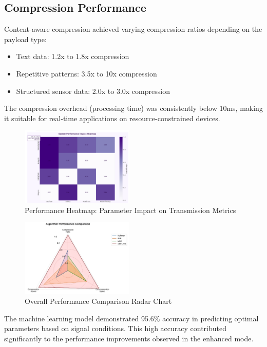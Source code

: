 \documentclass[conference]{IEEEtran}
\begin{document}
\subsection{Compression Performance}
Content-aware compression achieved varying compression ratios depending on the payload type:
\begin{itemize}
    \item Text data: 1.2x to 1.8x compression
    \item Repetitive patterns: 3.5x to 10x compression
    \item Structured sensor data: 2.0x to 3.0x compression
\end{itemize}

The compression overhead (processing time) was consistently below 10ms, making it suitable for real-time applications on resource-constrained devices.

\begin{figure}[htbp]
\centering
\includegraphics[width=0.48\textwidth]{images/performance-heatmap.png}
\caption{Performance Heatmap: Parameter Impact on Transmission Metrics}
\label{fig:performance_heatmap}
\end{figure}

\begin{figure}[htbp]
\centering
\includegraphics[width=0.48\textwidth]{images/overall-comparison-radar-chart.png}
\caption{Overall Performance Comparison Radar Chart}
\label{fig:radar_chart}
\end{figure}

The machine learning model demonstrated 95.6\% accuracy in predicting optimal parameters based on signal conditions. This high accuracy contributed significantly to the performance improvements observed in the enhanced mode.
\end{document}
